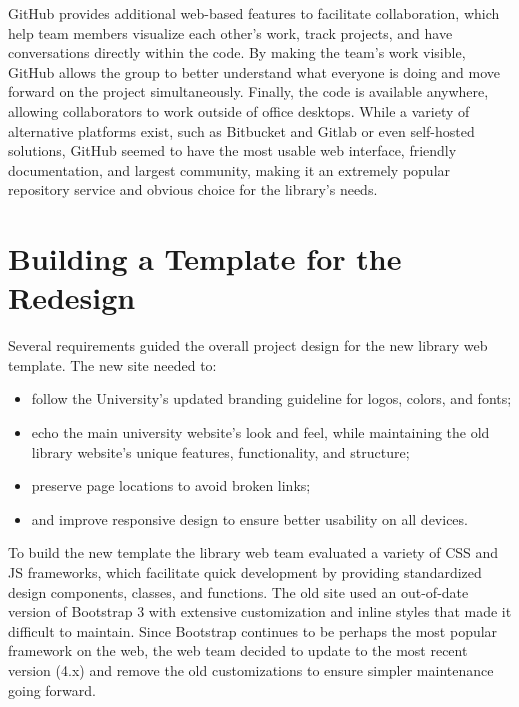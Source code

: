 \documentclass{book}
\providecommand{\tightlist}{%
  \setlength{\itemsep}{0pt}\setlength{\parskip}{0pt}}
\begin{document}
GitHub provides additional web-based features to facilitate collaboration,
which help team members visualize each other's work, track projects, and have
conversations directly within the code. By making the team's work visible,
GitHub allows the group to better understand what everyone is doing and move
forward on the project simultaneously. Finally, the code is available
anywhere, allowing collaborators to work outside of office desktops. While a
variety of alternative platforms exist, such as Bitbucket and Gitlab or even
self-hosted solutions, GitHub seemed to have the most usable web interface,
friendly documentation, and largest community, making it an extremely popular
repository service and obvious choice for the library's needs.

\hypertarget{building-a-template-for-the-redesign}{%
\section{Building a Template for the
Redesign}\label{building-a-template-for-the-redesign}}

Several requirements guided the overall project design for the new library web
template. The new site needed to:

\begin{itemize}
\tightlist
\item
  follow the University's updated branding guideline for logos, colors, and
  fonts;
\item
  echo the main university website's look and feel, while maintaining the old
  library website's unique features, functionality, and structure;
\item
  preserve page locations to avoid broken links;
\item
  and improve responsive design to ensure better usability on all devices.
\end{itemize}

To build the new template the library web team evaluated a variety of CSS and
JS frameworks, which facilitate quick development by providing standardized
design components, classes, and functions. The old site used an out-of-date
version of Bootstrap 3 with extensive customization and inline styles that
made it difficult to maintain. Since Bootstrap continues to be perhaps the
most popular framework on the web, the web team decided to update to the most
recent version (4.x) and remove the old customizations to ensure simpler
maintenance going forward.
\end{document}
